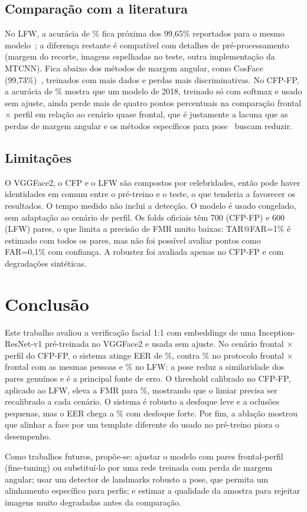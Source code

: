 \documentclass[conference,a4paper]{IEEEtran}
\begin{document}
\subsection{Comparação com a literatura}
No LFW, a acurácia de \accLFW\% fica próxima dos 99,65\% reportados para o mesmo
modelo~\cite{sandberg_facenet}; a diferença restante é compatível com detalhes de
pré-processamento (margem do recorte, imagens espelhadas no teste, outra
implementação da MTCNN). Fica abaixo dos métodos de margem angular, como CosFace
(99,73\%)~\cite{wang2018cosface}, treinados com mais dados e perdas mais
discriminativas. No CFP-FP, a acurácia de \accCFP\% mostra que um modelo de 2018,
treinado só com softmax e usado sem ajuste, ainda perde mais de quatro pontos
percentuais na comparação frontal $\times$ perfil em relação ao cenário quase
frontal, que é justamente a lacuna que as perdas de margem angular e os métodos
específicos para pose~\cite{tran2017disentangled,cao2018pose} buscam reduzir.

\subsection{Limitações}
O VGGFace2, o CFP e o LFW são compostos por celebridades, então pode haver identidades
em comum entre o pré-treino e o teste, o que tenderia a favorecer os resultados. O
tempo medido não inclui a detecção. O modelo é usado congelado, sem adaptação ao
cenário de perfil. Os folds oficiais têm 700 (CFP-FP) e 600 (LFW) pares, o que limita
a precisão de FMR muito baixas: TAR@FAR=1\% é estimado com todos os pares, mas não foi
possível avaliar pontos como FAR=0,1\% com confiança. A robustez foi avaliada apenas
no CFP-FP e com degradações sintéticas.

\section{Conclusão}
Este trabalho avaliou a verificação facial 1:1 com embeddings de uma
Inception-ResNet-v1 pré-treinada no VGGFace2 e usada sem ajuste. No cenário frontal
$\times$ perfil do CFP-FP, o sistema atinge EER de \eerCFP\%, contra \eerFF\% no
protocolo frontal $\times$ frontal com as mesmas pessoas e \eerLFW\% no LFW: a pose
reduz a similaridade dos pares genuínos e é a principal fonte de erro. O
threshold calibrado no CFP-FP, aplicado ao LFW, eleva a FMR para \fmrCross\%,
mostrando que o limiar precisa ser recalibrado a cada cenário. O sistema é robusto a
desfoque leve e a oclusões pequenas, mas o EER chega a \eerBlurAlta\% com desfoque
forte. Por fim, a ablação mostrou que alinhar a face por um template diferente do
usado no pré-treino piora o desempenho.

Como trabalhos futuros, propõe-se: ajustar o modelo com pares frontal-perfil
(fine-tuning) ou substituí-lo por uma rede treinada com perda de margem angular;
usar um detector de landmarks robusto a pose, que permita um alinhamento específico
para perfis; e estimar a qualidade da amostra para rejeitar imagens muito degradadas
antes da comparação.



\end{document}
